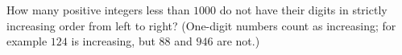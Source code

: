 How many positive integers less than $1000$ do not have their digits in strictly increasing order from left to right? (One-digit numbers count as increasing; for example $124$ is increasing, but $88$ and $946$ are not.)
